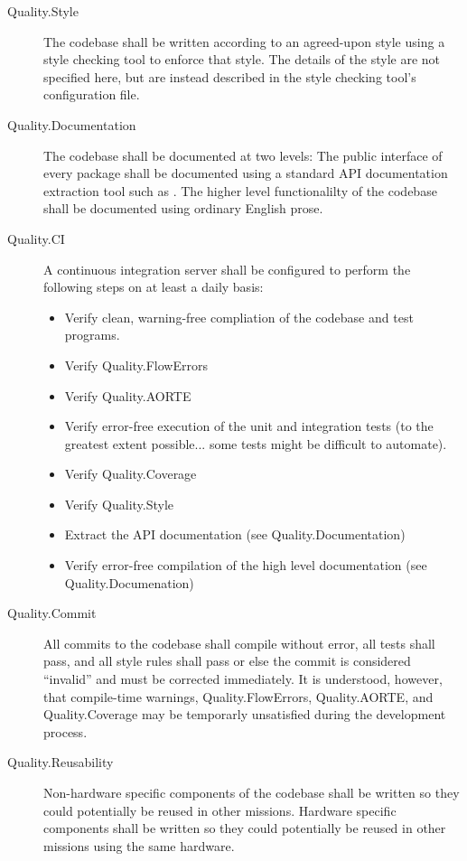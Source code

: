 \begin{description}
\item[Quality.Style] The codebase shall be written according to an
  agreed-upon style using a style checking tool to enforce that
  style. The details of the style are not specified here, but are
  instead described in the style checking tool's configuration file.

\item[Quality.Documentation] The codebase shall be documented at two
  levels: The public interface of every package shall be documented
  using a standard API documentation extraction tool such as
  . The higher level functionalilty of the codebase
  shall be documented using ordinary English prose.
  
\item[Quality.CI] A continuous integration server shall be configured
  to perform the following steps on at least a daily basis:
  \begin{itemize}
  \item Verify clean, warning-free compliation of the codebase and
    test programs.
  \item Verify Quality.FlowErrors
  \item Verify Quality.AORTE
  \item Verify error-free execution of the unit and integration tests
    (to the greatest extent possible... some tests might be difficult
    to automate).
  \item Verify Quality.Coverage
  \item Verify Quality.Style
  \item Extract the API documentation (see Quality.Documentation)
  \item Verify error-free compilation of the high level documentation
    (see Quality.Documenation)
  \end{itemize}

\item[Quality.Commit] All commits to the codebase shall compile
  without error, all tests shall pass, and all style rules shall pass
  or else the commit is considered ``invalid'' and must be corrected
  immediately. It is understood, however, that compile-time warnings,
  Quality.FlowErrors, Quality.AORTE, and Quality.Coverage may be
  temporarly unsatisfied during the development process.

\item[Quality.Reusability] Non-hardware specific components of the
  codebase shall be written so they could potentially be reused in
  other missions. Hardware specific components shall be written so
  they could potentially be reused in other missions using the same
  hardware.

\end{description}


